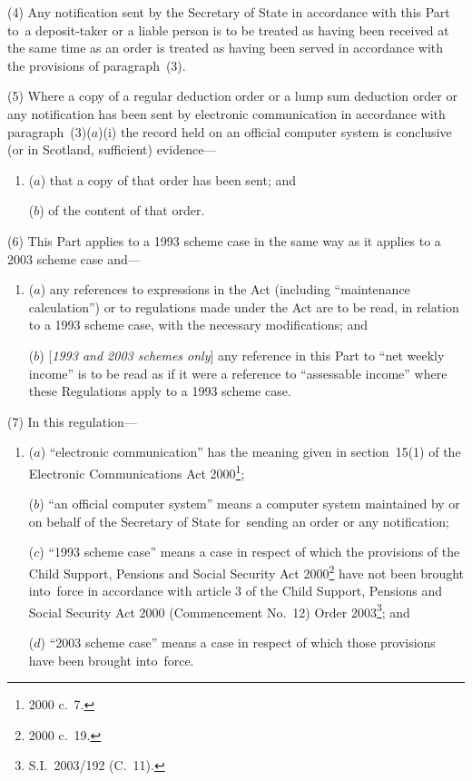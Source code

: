 \documentclass[12pt,a4paper]{article}
\begin{document}
(4) Any notification sent by the 
Secretary of State  %
in accordance with this Part to~a deposit-taker or a liable person is to be treated as having been received at the same time as an order is treated as having been served in accordance with the provisions of paragraph~(3).

(5) Where a copy of a regular deduction order or a lump sum deduction order or any notification has been sent by electronic communication in accordance with paragraph~(3)($a$)(i)  the record held on an official computer system is conclusive (or in Scotland, sufficient) evidence—
\begin{enumerate}\item[]
($a$) that a copy of that order has been sent; and

($b$) of the content of that order.
\end{enumerate}

(6) This Part applies to a 1993 scheme case in the same way as it applies to a 2003 scheme case and—
\begin{enumerate}\item[]
($a$) any references to expressions in the Act (including “maintenance calculation”) or to regulations made under the Act are to be read, in relation to a 1993 scheme case, with the necessary modifications; and

($b$) [\emph{1993 and 2003 schemes only}] any reference in this Part to “net weekly income” is to be read as if it were a reference to “assessable income” where these Regulations apply to a 1993 scheme case.
\end{enumerate}

(7) In this regulation—
\begin{enumerate}\item[]
($a$) “electronic communication” has the meaning given in section~15(1) of the Electronic Communications Act 2000\footnote{2000 c.~7.};

($b$) “an official computer system” means a computer system maintained by or on behalf of the 
Secretary of State  %
for~sending an order or any notification;

($c$) “1993 scheme case” means a case in respect of which the provisions of the Child Support, Pensions and Social Security Act 2000\footnote{2000 c.~19.} have not been brought into~force in accordance with article 3 of the Child Support, Pensions and Social Security Act 2000 (Commencement No.~12) Order 2003\footnote{S.I.~2003/192 (C.~11).}; and

($d$) “2003 scheme case” means a case in respect of which those provisions have been brought into~force.
\end{enumerate}
\end{document}
